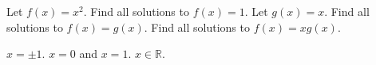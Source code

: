 \documentclass{article}
\begin{document}
    \createtitle

    \begin{problem}
	Let $f(x) = x^2$.
	\subproblem Find all solutions to $f(x) = 1$.
	\exitsubproblems
	Let $g(x) = x$.
	\subproblem Find all solutions to $f(x) = g(x)$.
	\subproblem Find all solutions to $f(x) = x g(x)$.
    \end{problem}

    \newpageifproblems

    \begin{solution}
	\subproblem $x = \pm 1$.
	\subproblem $x = 0$ and $x = 1$.
	\subproblem $x \in \mathbb{R}$.
    \end{solution}
\end{document}

